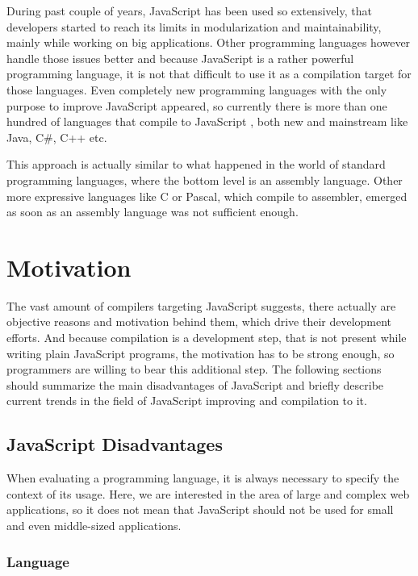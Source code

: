 \documentclass[12pt,a4paper]{report}
\begin{document}
During past couple of years, JavaScript has been used so extensively, that developers started to reach its limits in modularization and maintainability, mainly while working on big applications. Other programming languages however handle those issues better and because JavaScript is a rather powerful programming language, it is not that difficult to use it as a compilation target for those languages. Even completely new programming languages with the only purpose to improve JavaScript appeared, so currently there is more than one hundred of languages that compile to JavaScript \cite{Backends}, both new and mainstream like Java, C\#, C++ etc.

This approach is actually similar to what happened in the world of standard programming languages, where the bottom level is an assembly language. Other more expressive languages like C or Pascal, which compile to assembler, emerged as soon as an assembly language was not sufficient enough.

\section{Motivation}
\label{sec:Motivation}

The vast amount of compilers targeting JavaScript suggests, there actually are objective reasons and motivation behind them, which drive their development efforts. And because compilation is a development step, that is not present while writing plain JavaScript programs, the motivation has to be strong enough, so programmers are willing to bear this additional step. The following sections should summarize the main disadvantages of JavaScript and briefly describe current trends in the field of JavaScript improving and compilation to it.

\subsection{JavaScript Disadvantages}

When evaluating a programming language, it is always necessary to specify the context of its usage. Here, we are interested in the area of large and complex web applications, so it does not mean that JavaScript should not be used for small and even middle-sized applications.

\subsubsection*{Language} 
\end{document}
